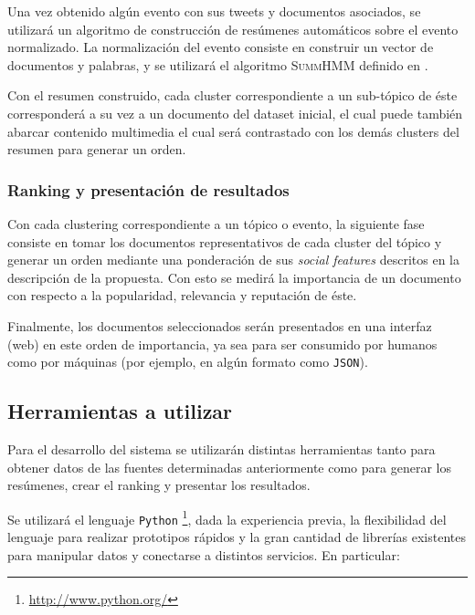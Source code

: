 \documentclass[11pt,letterpaper]{article}
\begin{document}
    Una vez obtenido algún evento con sus tweets y documentos
    asociados, se utilizará un algoritmo de construcción de resúmenes
    automáticos sobre el evento normalizado. La normalización del
    evento consiste en construir un vector de documentos y palabras, y
    se utilizará el algoritmo \textsc{SummHMM} definido en
    \cite{events}.

    Con el resumen construido, cada cluster correspondiente a un
    sub-tópico de éste corresponderá a su vez a un documento del
    dataset inicial, el cual puede también abarcar contenido
    multimedia el cual será contrastado con los demás clusters del
    resumen para generar un orden.

\subsubsection{Ranking y presentación de resultados}
\label{sec-5.1.3}

    
    Con cada clustering correspondiente a un tópico o evento, la
    siguiente fase consiste en tomar los documentos representativos de
    cada cluster del tópico y generar un orden mediante una
    ponderación de sus \emph{social features} descritos en la descripción de
    la propuesta. Con esto se medirá la importancia de un documento con
    respecto a la popularidad, relevancia y reputación de éste.

    Finalmente, los documentos seleccionados serán presentados en una
    interfaz (web) en este orden de importancia, ya sea para ser
    consumido por humanos como por máquinas (por ejemplo, en algún formato
    como \texttt{JSON}).

\subsection{Herramientas a utilizar}
\label{sec-5.2}

   Para el desarrollo del sistema se utilizarán distintas herramientas
   tanto para obtener datos de las fuentes determinadas anteriormente
   como para generar los resúmenes, crear el ranking y presentar los
   resultados.

   Se utilizará el lenguaje \texttt{Python} \footnote{\href{http://www.python.org/}{http://www.python.org/} },
   dada la experiencia previa, la flexibilidad del lenguaje para
   realizar prototipos rápidos y la gran cantidad de librerías
   existentes para manipular datos y conectarse a distintos
   servicios. En particular: 
\end{document}
